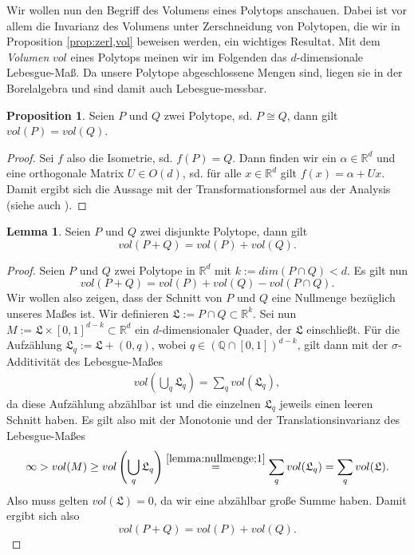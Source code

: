 \documentclass[11pt,titlepage]{article}
\newcommand{\setQ}{\mathbb{Q}}
\newcommand{\setR}{\mathbb{R}}
\theoremstyle{definition}
\newtheorem{proposition}[theorem]{Proposition}
\newtheorem{lemma}[theorem]{Lemma}
\theoremstyle{remark}
\begin{document}
	Wir wollen nun den Begriff des Volumens eines Polytops anschauen. Dabei ist 
	vor allem die Invarianz des Volumens unter Zerschneidung von Polytopen, die wir in Proposition \ref{prop:zerl,vol} beweisen werden, ein wichtiges Resultat. Mit dem \textsl{Volumen} $vol$ eines Polytops meinen wir im Folgenden das 
	$d$-dimensionale Lebesgue-Maß. Da unsere Polytope abgeschlossene Mengen 
	sind, liegen sie in der Borelalgebra und sind damit auch Lebesgue-messbar.
	
	\begin{proposition} \label{prop:cong,vol}
		Seien $P$ und $Q$ zwei Polytope, sd. $P\cong Q$, dann gilt $vol(P)=vol(Q)$.
	\end{proposition}
	
	\begin{proof}
		Sei $f$ also die Isometrie, sd. $f(P)=Q$. Dann finden wir ein 
		$\alpha\in\setR^d$ und eine orthogonale Matrix $U\in O(d)$, sd. für 
		alle $x\in\setR^d$ gilt $f(x)=\alpha+Ux$. Damit ergibt sich die Aussage 
		mit der Transformationsformel 
		aus der Analysis (siehe auch \cite[Satz 4.7]{SkriptAna3}).
	\end{proof}
	
	\begin{lemma}\label{lemma:nullmenge}
		Seien $P$ und $Q$ zwei disjunkte Polytope, dann gilt
		\[ vol(P+Q)=vol(P)+vol(Q).\]
	\end{lemma}

	\begin{proof}
		Seien $P$ und $Q$ zwei Polytope in $\setR^d$ 
		mit $k:=dim(P\cap Q)<d$. Es gilt nun 
		\[vol(P+Q)=vol(P)+vol(Q)-vol(P\cap Q).\]
		Wir wollen also zeigen, dass der Schnitt von $P$ und $Q$ eine Nullmenge bezüglich unseres Maßes ist. 
		Wir definieren $\mathfrak{L}:=P\cap Q \subset \setR^k$. Sei nun  $M:=\mathfrak{L}\times[0,1]^{d-k}\subset\setR^d$ ein $d$-dimensionaler Quader, der 
		$\mathfrak{L}$ einschließt. Für die Aufzählung $\mathfrak{L}_q:=\mathfrak{L}+(0,q)$, wobei $q\in(\setQ\cap[0,1])^{d-k}$, gilt dann mit der $\sigma$-Additivität des Lebesgue-Maßes
		\begin{align}
			vol \left(\bigcup_q\mathfrak{L}_q\right)=\sum_q vol(\mathfrak{L}_q), \label{lemma:nullmenge;1}
		\end{align}
		da diese Aufzählung abzählbar ist und die einzelnen $\mathfrak{L}_q$ jeweils einen leeren Schnitt haben. Es gilt also mit der Monotonie und der Translationsinvarianz des Lebesgue-Maßes
		\[\infty>vol(M)\geq vol\left(\bigcup_q \mathfrak{L}_q\right)\overset{\ref{lemma:nullmenge;1}}{=}\sum_q vol(\mathfrak{L}_q)=\sum_q vol(\mathfrak{L}).\]
		Also muss gelten $vol(\mathfrak{L})=0$, da wir eine abzählbar große Summe haben. 
		Damit ergibt sich also
		\[vol(P+Q)=vol(P)+vol(Q).\]
	\end{proof}
\end{document}
